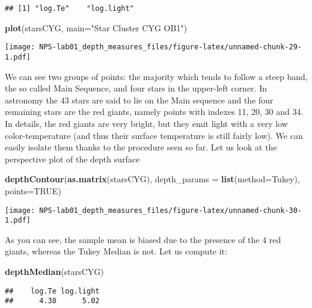 \documentclass[
]{article}
\newenvironment{Shaded}{\begin{snugshade}}{\end{snugshade}}
\newcommand{\AttributeTok}[1]{\textcolor[rgb]{0.13,0.29,0.53}{#1}}
\newcommand{\ConstantTok}[1]{\textcolor[rgb]{0.56,0.35,0.01}{#1}}
\newcommand{\FunctionTok}[1]{\textcolor[rgb]{0.13,0.29,0.53}{\textbf{#1}}}
\newcommand{\NormalTok}[1]{#1}
\newcommand{\StringTok}[1]{\textcolor[rgb]{0.31,0.60,0.02}{#1}}
\begin{document}
\begin{verbatim}
## [1] "log.Te"    "log.light"
\end{verbatim}

\begin{Shaded}
\begin{Highlighting}[]
\FunctionTok{plot}\NormalTok{(starsCYG, }\AttributeTok{main=}\StringTok{"Star Cluster CYG OB1"}\NormalTok{)}
\end{Highlighting}
\end{Shaded}

\texttt{[image: NPS-lab01\_depth\_measures\_files/figure-latex/unnamed-chunk-29-1.pdf]}

We can see two groups of points: the majority which tends to follow a
steep band, the so called Main Sequence, and four stars in the
upper-left corner. In astronomy the \(43\) stars are said to lie on the
Main sequence and the four remaining stars are the red giants, namely
points with indexes 11, 20, 30 and 34. In details, the red giants are
very bright, but they emit light with a very low color-temperature (and
thus their surface temperature is still fairly low). We can easily
isolate them thanks to the procedure seen so far. Let us look at the
perspective plot of the depth surface

\begin{Shaded}
\begin{Highlighting}[]
\FunctionTok{depthContour}\NormalTok{(}\FunctionTok{as.matrix}\NormalTok{(starsCYG), }\AttributeTok{depth\_params =} \FunctionTok{list}\NormalTok{(}\AttributeTok{method=}\StringTok{\textquotesingle{}Tukey\textquotesingle{}}\NormalTok{), }\AttributeTok{points=}\ConstantTok{TRUE}\NormalTok{)}
\end{Highlighting}
\end{Shaded}

\texttt{[image: NPS-lab01\_depth\_measures\_files/figure-latex/unnamed-chunk-30-1.pdf]}

As you can see, the sample mean is biased due to the presence of the 4
red giants, whereas the Tukey Median is not. Let us compute it:

\begin{Shaded}
\begin{Highlighting}[]
\FunctionTok{depthMedian}\NormalTok{(starsCYG) }
\end{Highlighting}
\end{Shaded}

\begin{verbatim}
##    log.Te log.light 
##      4.38      5.02
\end{verbatim}
\end{document}

